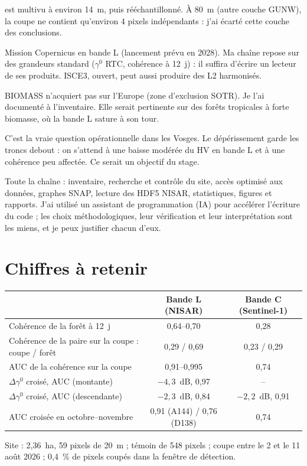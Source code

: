 \documentclass[11pt,a4paper]{article}
\begin{document}
\begin{description}
  est multivu à environ 14~m, puis rééchantillonné. À 80~m (autre couche GUNW), la coupe ne contient qu'environ
  4 pixels indépendants : j'ai écarté cette couche des conclusions.
\item[Et ROSE-L ?] Mission Copernicus en bande L (lancement prévu en 2028). Ma chaîne repose sur des grandeurs
  standard ($\gamma^0$ RTC, cohérence à 12~j) : il suffira d'écrire un lecteur de ses produits. ISCE3, ouvert, peut
  aussi produire des L2 harmonisés.
\item[Et la bande P (BIOMASS) ?] BIOMASS n'acquiert pas sur l'Europe (zone d'exclusion SOTR). Je l'ai documenté à
  l'inventaire. Elle serait pertinente sur des forêts tropicales à forte biomasse, où la bande L sature à son tour.
\item[Coupe ou dépérissement de scolytes ?] C'est la vraie question opérationnelle dans les Vosges. Le dépérissement
  garde les troncs debout : on s'attend à une baisse modérée du HV en bande L et à une cohérence peu affectée. Ce
  serait un objectif du stage.
\item[Qu'avez-vous fait vous-même ?] Toute la chaîne : inventaire, recherche et contrôle du site, accès optimisé aux
  données, graphes SNAP, lecture des HDF5 NISAR, statistiques, figures et rapports. J'ai utilisé un assistant de
  programmation (IA) pour accélérer l'écriture du code ; les choix méthodologiques, leur vérification et leur
  interprétation sont les miens, et je peux justifier chacun d'eux.
\end{description}

\section{Chiffres à retenir}

\begin{center}
\begin{tabular}{lcc}
\toprule
 & Bande L (NISAR) & Bande C (Sentinel-1) \\
\midrule
Cohérence de la forêt à 12~j & 0,64--0,70 & 0,28 \\
Cohérence de la paire sur la coupe : coupe / forêt & 0,29 / 0,69 & 0,23 / 0,29 \\
AUC de la cohérence sur la coupe & 0,91--0,995 & 0,74 \\
$\Delta\gamma^0$ croisé, AUC (montante) & $-4{,}3$~dB, 0,97 & -- \\
$\Delta\gamma^0$ croisé, AUC (descendante) & $-2{,}3$~dB, 0,84 & $-2{,}2$~dB, 0,91 \\
AUC croisée en octobre--novembre & 0,91 (A144) / 0,76 (D138) & 0,74 \\
\bottomrule
\end{tabular}
\end{center}
Site : 2,36~ha, 59 pixels de 20~m ; témoin de 548 pixels ; coupe entre le 2 et le 11 août 2026 ; 0,4~\% de pixels
coupés dans la fenêtre de détection.
\end{document}
